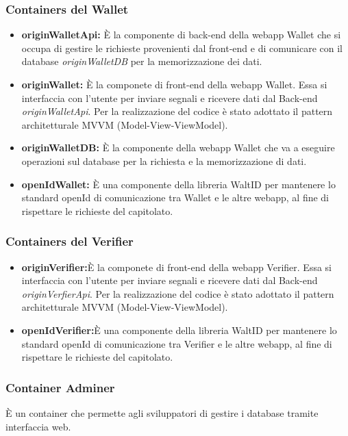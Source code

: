 \subsubsection{Containers del \textbf{Wallet}}
\begin{itemize}
    \item \textbf{originWalletApi:} È la componente di back-end della webapp Wallet che si occupa di gestire le richieste provenienti dal front-end e di comunicare con il database \textit{originWalletDB} per la memorizzazione dei dati.
    \item \textbf{originWallet:} È la componete di front-end della webapp Wallet. Essa si interfaccia con l'utente per inviare segnali e ricevere dati dal Back-end \textit{originWalletApi}. Per la realizzazione del codice è stato adottato il pattern architetturale MVVM (Model-View-ViewModel).
    \item \textbf{originWalletDB:} È la componente della webapp Wallet che va a eseguire operazioni sul database per la richiesta e la memorizzazione di dati.
    \item \textbf{openIdWallet:} È una componente della libreria WaltID per mantenere lo standard openId di comunicazione tra Wallet e le altre webapp, al fine di rispettare le richieste del capitolato.
\end{itemize}
\subsubsection{Containers del \textbf{Verifier}}
\begin{itemize}
    \item \textbf{originVerifier:}È la componete di front-end della webapp Verifier. Essa si interfaccia con l'utente per inviare segnali e ricevere dati dal Back-end \textit{originVerfierApi}. Per la realizzazione del codice è stato adottato il pattern architetturale MVVM (Model-View-ViewModel).
    \item \textbf{openIdVerifier:}È una componente della libreria WaltID per mantenere lo standard openId di comunicazione tra Verifier e le altre webapp, al fine di rispettare le richieste del capitolato.
\end{itemize}
\subsubsection{Container \textbf{Adminer}}
È un container che permette agli sviluppatori di gestire i database tramite interfaccia web.

